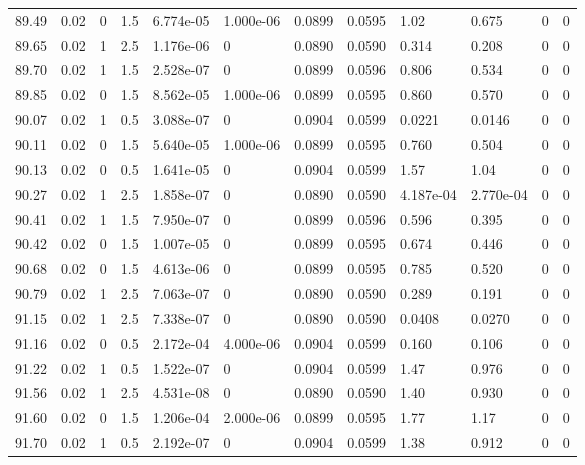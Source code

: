 \documentclass[preview]{standalone}
\begin{document}
{{{{{{{{{{{{{{{{{{\begin{tabular}{L{1.2cm}C{1.2cm} C{0.3cm}C{0.5cm} C{1.4cm}C{1.4cm} C{1.4cm}C{1.4cm} C{1.6cm}C{1.6cm} C{1.6cm}C{1.6cm}}
  89.49  &  0.02  & 0     & 1.5 &  6.774e-05  & 1.000e-06  &  0.0899&   0.0595& 1.02 & 0.675   &  0 & 0  \\ 
  89.65  &  0.02  & 1     & 2.5 &  1.176e-06  & 0  &  0.0890&   0.0590& 0.314 & 0.208   &  0 & 0  \\ 
  89.70  &  0.02  & 1     & 1.5 &  2.528e-07  & 0  &  0.0899&   0.0596& 0.806 & 0.534   &  0 & 0  \\ 
  89.85  &  0.02  & 0     & 1.5 &  8.562e-05  & 1.000e-06  &  0.0899&   0.0595& 0.860 & 0.570   &  0 & 0  \\ 
  90.07  &  0.02  & 1     & 0.5 &  3.088e-07  & 0  &  0.0904&   0.0599& 0.0221 & 0.0146   &  0 & 0  \\ 
  90.11  &  0.02  & 0     & 1.5 &  5.640e-05  & 1.000e-06  &  0.0899&   0.0595& 0.760 & 0.504   &  0 & 0  \\ 
  90.13  &  0.02  & 0     & 0.5 &  1.641e-05  & 0  &  0.0904&   0.0599& 1.57 & 1.04   &  0 & 0  \\ 
  90.27  &  0.02  & 1     & 2.5 &  1.858e-07  & 0  &  0.0890&   0.0590& 4.187e-04 & 2.770e-04   &  0 & 0  \\ 
  90.41  &  0.02  & 1     & 1.5 &  7.950e-07  & 0  &  0.0899&   0.0596& 0.596 & 0.395   &  0 & 0  \\ 
  90.42  &  0.02  & 0     & 1.5 &  1.007e-05  & 0  &  0.0899&   0.0595& 0.674 & 0.446   &  0 & 0  \\ 
  90.68  &  0.02  & 0     & 1.5 &  4.613e-06  & 0  &  0.0899&   0.0595& 0.785 & 0.520   &  0 & 0  \\ 
  90.79  &  0.02  & 1     & 2.5 &  7.063e-07  & 0  &  0.0890&   0.0590& 0.289 & 0.191   &  0 & 0  \\ 
  91.15  &  0.02  & 1     & 2.5 &  7.338e-07  & 0  &  0.0890&   0.0590& 0.0408 & 0.0270   &  0 & 0  \\ 
  91.16  &  0.02  & 0     & 0.5 &  2.172e-04  & 4.000e-06  &  0.0904&   0.0599& 0.160 & 0.106   &  0 & 0  \\ 
  91.22  &  0.02  & 1     & 0.5 &  1.522e-07  & 0  &  0.0904&   0.0599& 1.47 & 0.976   &  0 & 0  \\ 
  91.56  &  0.02  & 1     & 2.5 &  4.531e-08  & 0  &  0.0890&   0.0590& 1.40 & 0.930   &  0 & 0  \\ 
  91.60  &  0.02  & 0     & 1.5 &  1.206e-04  & 2.000e-06  &  0.0899&   0.0595& 1.77 & 1.17   &  0 & 0  \\ 
  91.70  &  0.02  & 1     & 0.5 &  2.192e-07  & 0  &  0.0904&   0.0599& 1.38 & 0.912   &  0 & 0  \\ 

\end{tabular}}}}}}}}}}}}}}}}}}}
\end{document}
